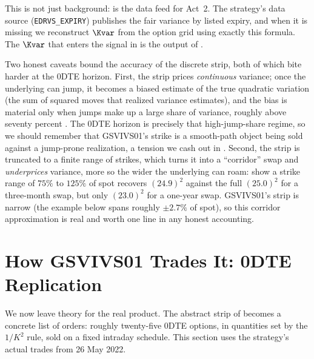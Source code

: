 \begin{projectconnection}
This is not just background:  is the data feed for Act~2. The strategy's data source (\texttt{EDRVS\_EXPIRY}) publishes the fair variance by listed expiry, and when it is missing we reconstruct $\Kvar$ from the option grid using exactly this formula. The $\Kvar$ that enters the signal in  is the output of .
\end{projectconnection}

Two honest caveats bound the accuracy of the discrete strip, both of which bite harder at the 0DTE horizon. First, the strip prices \emph{continuous} variance; once the underlying can jump, it becomes a biased estimate of the true quadratic variation (the sum of squared moves that realized variance estimates), and the bias is material only when jumps make up a large share of variance, roughly above seventy percent \citep{DuKapadia2012}. The 0DTE horizon is precisely that high-jump-share regime, so we should remember that GSVIVS01's strike is a smooth-path object being sold against a jump-prone realization, a tension we cash out in . Second, the strip is truncated to a finite range of strikes, which turns it into a ``corridor'' swap and \emph{underprices} variance, more so the wider the underlying can roam: \citet[Table~4, p.~28]{Demeterfi1999} show a strike range of $75\%$ to $125\%$ of spot recovers $(24.9)^2$ against the full $(25.0)^2$ for a three-month swap, but only $(23.0)^2$ for a one-year swap. GSVIVS01's strip is narrow (the example below spans roughly $\pm 2.7\%$ of spot), so this corridor approximation is real and worth one line in any honest accounting.

\section{How GSVIVS01 Trades It: 0DTE Replication}
\label{sec:gsvivs:replication}

We now leave theory for the real product. The abstract strip of  becomes a concrete list of orders: roughly twenty-five 0DTE options, in quantities set by the $1/K^2$ rule, sold on a fixed intraday schedule. This section uses the strategy's actual trades from 26 May 2022.

